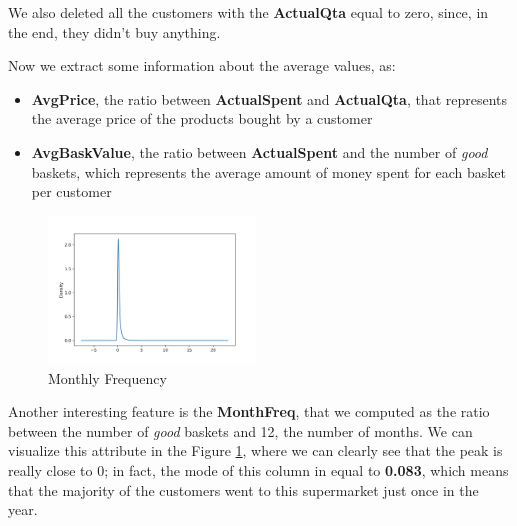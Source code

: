 We also deleted all the customers with the \textbf{ActualQta} equal to zero, since, in the end, they didn't buy anything. 

Now we extract some information about the average values, as:
\begin{itemize}
\item \textbf{AvgPrice}, the ratio between \textbf{ActualSpent} and \textbf{ActualQta}, that represents the average price of the products bought by a customer
\item \textbf{AvgBaskValue}, the ratio between \textbf{ActualSpent} and the number of \emph{good} baskets, which represents the average amount of money spent for each basket per customer
\end{itemize}

\begin{figure}
\centering
\includegraphics[width=0.49\textwidth]{img/monthfreq.png}
\caption{Monthly Frequency}
\label{fig:month_freq}
\end{figure}

Another interesting feature is the \textbf{MonthFreq}, that we computed as the ratio between the number of \emph{good} baskets and 12, the number of months. We can visualize this attribute in the Figure \ref{fig:month_freq}, where we can clearly see that the peak is really close to 0; in fact, the mode of this column in equal to \textbf{0.083}, which means that the majority of the customers went to this supermarket just once in the year.

